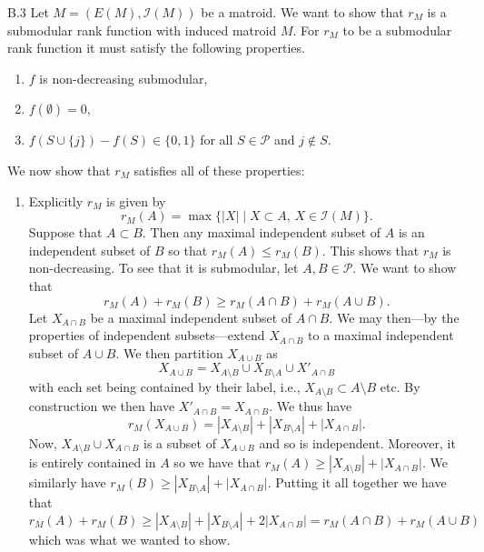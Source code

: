 \documentclass[a4paper]{article}
\begin{document}
  \begin{exercise}{B.3}
    Let $ M = (E(M), \mathcal{I}(M)) $ be a matroid. We want to show that $ r_M $ is a submodular rank function with induced matroid $ M $. For $ r_M $ to be a submodular rank function it must satisfy the following properties.
    \begin{enumerate}[label=(\roman*)]
      \item $ f $ is non-decreasing submodular,
      \item $ f(\emptyset) = 0 $,
      \item $ f(S \cup \{j\}) - f(S) \in \{0, 1\} $ for all $ S \in \mathcal{P} $ and $ j \not\in S $.
    \end{enumerate}
    We now show that $ r_M $ satisfies all of these properties:
    \begin{enumerate}[label=(\roman*)]
      \item Explicitly $ r_M $ is given by
        \begin{equation*}
          r_M(A) = \max \{|X| \mid X \subset A,\, X\in \mathcal{I}(M)\}
        .\end{equation*}
        Suppose that $ A \subset B $. Then any maximal independent subset of $ A $ is an independent subset of $ B $ so that $ r_M(A) \leq r_M(B) $. This shows that $ r_M $ is non-decreasing. To see that it is submodular, let $ A, B \in \mathcal{P} $. We want to show that
        \begin{equation*}
        r_M(A) + r_M(B) \geq r_M(A \cap B) + r_M(A \cup B)
        .\end{equation*}
        Let $ X_{A \cap B} $ be a maximal independent subset of $ A \cap B $. We may then---by the properties of independent subsets---extend $ X_{A \cap B} $ to a maximal independent subset of $ A \cup B $. We then partition $ X_{A \cup B} $ as
        \begin{equation*}
        X_{A \cup B} = X_{A\setminus B} \cup X_{B\setminus A} \cup X'_{A \cap B}
        \end{equation*}
        with each set being contained by their label, i.e., $ X_{A \setminus B} \subset A \setminus B $ etc. By construction we then have $ X'_{A \cap B} = X_{ A \cap B} $. We thus have
        \begin{equation*}
        r_M(X_{A \cup B}) = |X_{A\setminus B}| + |X_{B \setminus A}| + |X_{A \cap B}|
        .\end{equation*}
        Now, $ X_{A \setminus B} \cup X_{A \cap B} $ is a subset of $ X_{A \cup B} $ and so is independent. Moreover, it is entirely contained in $ A $ so we have that $ r_M(A) \geq |X_{A\setminus B}| + |X_{A \cap B}| $. We similarly have $ r_M(B) \geq |X_{B \setminus A}| + |X_{A \cap B}| $. Putting it all together we have that
        \begin{equation*}
        r_M(A) + r_M(B) \geq |X_{A\setminus B}| + |X_{B\setminus A}| + 2|X_{A \cap B}| = r_M(A \cap B) + r_M(A \cup B)
        \end{equation*}
        which was what we wanted to show.


\end{enumerate}
\end{exercise}
\end{document}

